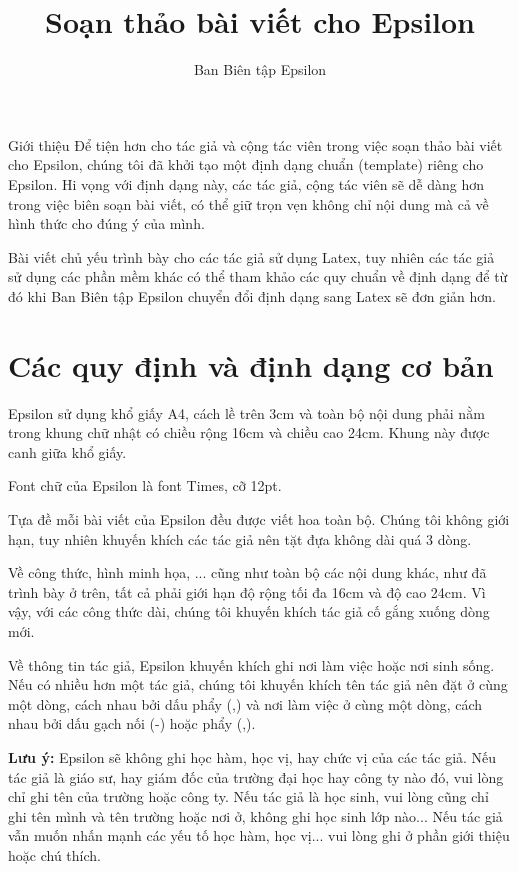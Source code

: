 \documentclass[12pt,a4paper]{epsilon}
\title{Soạn thảo bài viết cho Epsilon}
\author{Ban Biên tập Epsilon}
\begin{document}
\maketitle
\begin{newAbstract}{Giới thiệu}
Để tiện hơn cho tác giả và cộng tác viên trong việc soạn thảo bài viết cho Epsilon, chúng tôi đã khởi tạo một định dạng chuẩn (template) riêng cho Epsilon. Hi vọng với định dạng này, các tác giả, cộng tác viên sẽ dễ dàng hơn trong việc biên soạn bài viết, có thể giữ trọn vẹn không chỉ nội dung mà cả về hình thức cho đúng ý của mình.

Bài viết chủ yếu trình bày cho các tác giả sử dụng Latex, tuy nhiên các tác giả sử dụng các phần mềm khác có thể tham khảo các quy chuẩn về định dạng để từ đó khi Ban Biên tập Epsilon chuyển đổi định dạng sang Latex sẽ đơn giản hơn.
\end{newAbstract}

\section{Các quy định và định dạng cơ bản}
Epsilon sử dụng khổ giấy A4, cách lề trên 3cm và toàn bộ nội dung phải nằm trong khung chữ nhật có chiều rộng 16cm và chiều cao 24cm. Khung này được canh giữa khổ giấy.

Font chữ của Epsilon là font Times, cỡ 12pt. 

Tựa đề mỗi bài viết của Epsilon đều được viết hoa toàn bộ. Chúng tôi không giới hạn, tuy nhiên khuyến khích các tác giả nên tặt đựa không dài quá 3 dòng.

Về công thức, hình minh họa, ... cũng như toàn bộ các nội dung khác, như đã trình bày ở trên, tất cả phải giới hạn độ rộng tối đa 16cm và độ cao 24cm. Vì vậy, với các công thức dài, chúng tôi khuyến khích tác giả cố gắng xuống dòng mới.

Về thông tin tác giả, Epsilon khuyến khích ghi nơi làm việc hoặc nơi sinh sống. Nếu có nhiều hơn một tác giả, chúng tôi khuyến khích tên tác giả nên đặt ở cùng một dòng, cách nhau bởi dấu phẩy (,) và nơi làm việc ở cùng một dòng, cách nhau bởi dấu  gạch nối (-) hoặc phẩy (,).

\textbf{\epsilonHighlightColor Lưu ý:} Epsilon sẽ không ghi học hàm, học vị, hay chức vị của các tác giả. Nếu tác giả là giáo sư, hay giám đốc của trường đại học hay công ty nào đó, vui lòng chỉ ghi tên của trường hoặc công ty. Nếu tác giả là học sinh, vui lòng cũng chỉ ghi tên mình và tên trường hoặc nơi ở, không ghi học sinh lớp nào... Nếu tác giả vẫn muốn nhấn mạnh các yếu tố học hàm, học vị... vui lòng ghi ở phần giới thiệu hoặc chú thích.
\end{document}
